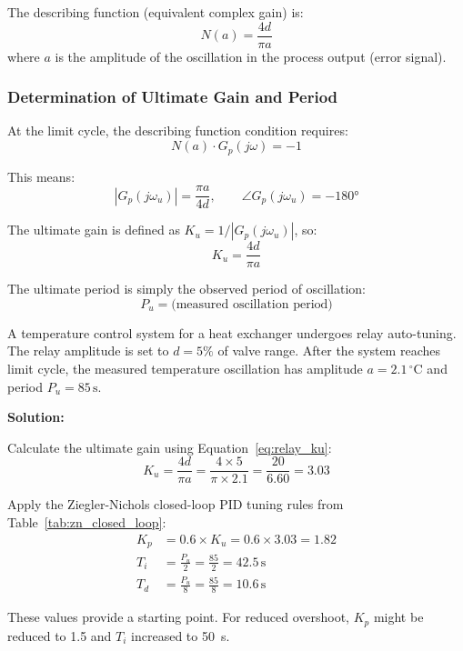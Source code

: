 The describing function (equivalent complex gain) is:
\begin{equation}
    N(a) = \frac{4d}{\pi a}
\end{equation}
where $a$ is the amplitude of the oscillation in the process output (error signal).

\subsubsection{Determination of Ultimate Gain and Period}

At the limit cycle, the describing function condition requires:
\begin{equation}
    N(a) \cdot G_p(j\omega) = -1
\end{equation}

This means:
\begin{equation}
    |G_p(j\omega_u)| = \frac{\pi a}{4d}, \qquad \angle G_p(j\omega_u) = -180°
\end{equation}

The ultimate gain is defined as $K_u = 1/|G_p(j\omega_u)|$, so:
\begin{equation}
    \boxed{K_u = \frac{4d}{\pi a}}
    \label{eq:relay_ku}
\end{equation}

The ultimate period is simply the observed period of oscillation:
\begin{equation}
    \boxed{P_u = \text{(measured oscillation period)}}
\end{equation}

\begin{examplebox}
A temperature control system for a heat exchanger undergoes relay auto-tuning. The relay amplitude is set to $d = 5\%$ of valve range. After the system reaches limit cycle, the measured temperature oscillation has amplitude $a = 2.1\,^{\circ}\text{C}$ and period $P_u = 85\,\text{s}$.

\textbf{Solution:}

Calculate the ultimate gain using Equation~\eqref{eq:relay_ku}:
\begin{equation*}
K_u = \frac{4d}{\pi a} = \frac{4 \times 5}{\pi \times 2.1} = \frac{20}{6.60} = 3.03
\end{equation*}

Apply the Ziegler-Nichols closed-loop PID tuning rules from Table~\ref{tab:zn_closed_loop}:
\begin{align*}
K_p &= 0.6 \times K_u = 0.6 \times 3.03 = 1.82 \\
T_i &= \frac{P_u}{2} = \frac{85}{2} = 42.5\,\text{s} \\
T_d &= \frac{P_u}{8} = \frac{85}{8} = 10.6\,\text{s}
\end{align*}

These values provide a starting point. For reduced overshoot, $K_p$ might be reduced to 1.5 and $T_i$ increased to 50~s.
\end{examplebox}

